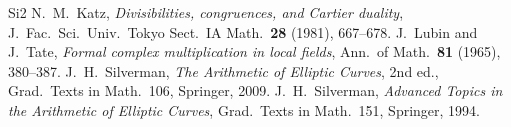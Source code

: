 \documentclass[reqno]{amsart}
\theoremstyle{definition}
\theoremstyle{plain}
\begin{document}
\begin{thebibliography}{Si2}
 N.~M.~Katz, \emph{Divisibilities, congruences, and Cartier duality}, J.\ Fac.\ Sci.\ Univ.\ Tokyo Sect.\ IA Math.\ \textbf{28} (1981), 667--678.
 J.~Lubin and J.~Tate, \emph{Formal complex multiplication in local fields}, Ann.\ of Math.\ \textbf{81} (1965), 380--387.
 J.~H.~Silverman, \emph{The Arithmetic of Elliptic Curves}, 2nd ed., Grad.\ Texts in Math.\ 106, Springer, 2009.
 J.~H.~Silverman, \emph{Advanced Topics in the Arithmetic of Elliptic Curves}, Grad.\ Texts in Math.\ 151, Springer, 1994.
\end{thebibliography}
\end{document}

